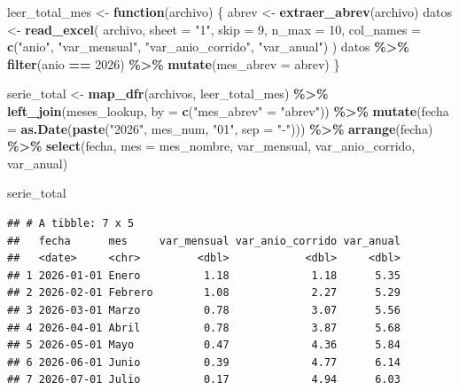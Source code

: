 \documentclass[
]{article}
\newenvironment{Shaded}{\begin{snugshade}}{\end{snugshade}}
\newcommand{\AttributeTok}[1]{\textcolor[rgb]{0.13,0.29,0.53}{#1}}
\newcommand{\ControlFlowTok}[1]{\textcolor[rgb]{0.13,0.29,0.53}{\textbf{#1}}}
\newcommand{\DecValTok}[1]{\textcolor[rgb]{0.00,0.00,0.81}{#1}}
\newcommand{\FunctionTok}[1]{\textcolor[rgb]{0.13,0.29,0.53}{\textbf{#1}}}
\newcommand{\NormalTok}[1]{#1}
\newcommand{\OtherTok}[1]{\textcolor[rgb]{0.56,0.35,0.01}{#1}}
\newcommand{\SpecialCharTok}[1]{\textcolor[rgb]{0.81,0.36,0.00}{\textbf{#1}}}
\newcommand{\StringTok}[1]{\textcolor[rgb]{0.31,0.60,0.02}{#1}}
\begin{document}
\begin{Shaded}
\begin{Highlighting}[]
\NormalTok{leer\_total\_mes }\OtherTok{\textless{}{-}} \ControlFlowTok{function}\NormalTok{(archivo) \{}
\NormalTok{  abrev }\OtherTok{\textless{}{-}} \FunctionTok{extraer\_abrev}\NormalTok{(archivo)}
\NormalTok{  datos }\OtherTok{\textless{}{-}} \FunctionTok{read\_excel}\NormalTok{(}
\NormalTok{    archivo, }\AttributeTok{sheet =} \StringTok{"1"}\NormalTok{, }\AttributeTok{skip =} \DecValTok{9}\NormalTok{, }\AttributeTok{n\_max =} \DecValTok{10}\NormalTok{,}
    \AttributeTok{col\_names =} \FunctionTok{c}\NormalTok{(}\StringTok{"anio"}\NormalTok{, }\StringTok{"var\_mensual"}\NormalTok{, }\StringTok{"var\_anio\_corrido"}\NormalTok{, }\StringTok{"var\_anual"}\NormalTok{)}
\NormalTok{  )}
\NormalTok{  datos }\SpecialCharTok{\%\textgreater{}\%}
    \FunctionTok{filter}\NormalTok{(anio }\SpecialCharTok{==} \DecValTok{2026}\NormalTok{) }\SpecialCharTok{\%\textgreater{}\%}
    \FunctionTok{mutate}\NormalTok{(}\AttributeTok{mes\_abrev =}\NormalTok{ abrev)}
\NormalTok{\}}

\NormalTok{serie\_total }\OtherTok{\textless{}{-}} \FunctionTok{map\_dfr}\NormalTok{(archivos, leer\_total\_mes) }\SpecialCharTok{\%\textgreater{}\%}
  \FunctionTok{left\_join}\NormalTok{(meses\_lookup, }\AttributeTok{by =} \FunctionTok{c}\NormalTok{(}\StringTok{"mes\_abrev"} \OtherTok{=} \StringTok{"abrev"}\NormalTok{)) }\SpecialCharTok{\%\textgreater{}\%}
  \FunctionTok{mutate}\NormalTok{(}\AttributeTok{fecha =} \FunctionTok{as.Date}\NormalTok{(}\FunctionTok{paste}\NormalTok{(}\StringTok{"2026"}\NormalTok{, mes\_num, }\StringTok{"01"}\NormalTok{, }\AttributeTok{sep =} \StringTok{"{-}"}\NormalTok{))) }\SpecialCharTok{\%\textgreater{}\%}
  \FunctionTok{arrange}\NormalTok{(fecha) }\SpecialCharTok{\%\textgreater{}\%}
  \FunctionTok{select}\NormalTok{(fecha, }\AttributeTok{mes =}\NormalTok{ mes\_nombre, var\_mensual, var\_anio\_corrido, var\_anual)}

\NormalTok{serie\_total}
\end{Highlighting}
\end{Shaded}

\begin{verbatim}
## # A tibble: 7 x 5
##   fecha      mes     var_mensual var_anio_corrido var_anual
##   <date>     <chr>         <dbl>            <dbl>     <dbl>
## 1 2026-01-01 Enero          1.18             1.18      5.35
## 2 2026-02-01 Febrero        1.08             2.27      5.29
## 3 2026-03-01 Marzo          0.78             3.07      5.56
## 4 2026-04-01 Abril          0.78             3.87      5.68
## 5 2026-05-01 Mayo           0.47             4.36      5.84
## 6 2026-06-01 Junio          0.39             4.77      6.14
## 7 2026-07-01 Julio          0.17             4.94      6.03
\end{verbatim}
\end{document}
